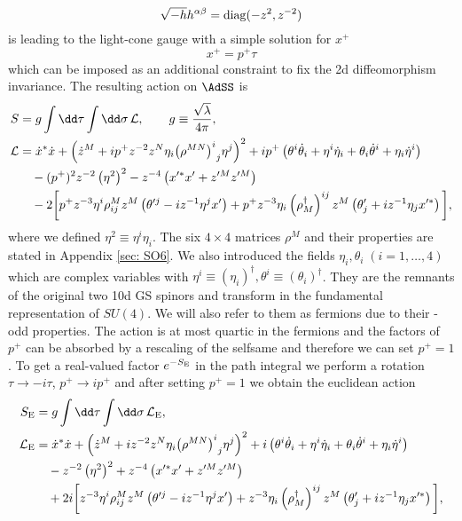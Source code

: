%
%
\begin{equation}
\sqrt{-h}h^{\alpha\beta} = {\rm diag}(-z^{2},z^{-2})
\end{equation}
%
%
is leading to the light-cone gauge with a simple solution for $x^{+}$ 
%
%
\begin{equation}
x^{+} = p^{+}\tau
\end{equation}
%
%
which can be imposed as an additional constraint to fix the 2d  diffeomorphism invariance. The resulting action on $\AdSS$ is 
%
%
\begin{align}
S &= g \int \dd \tau \int \dd \sigma \, \mathcal{L}, \qquad g\equiv \frac{\sqrt{\lambda}}{4\pi},  \\
%
\mathcal{L} &= \dot{x}^{*}\dot{x} + \left( \dot{z}^{M} + ip^{+}z^{-2}z^{N}\eta_{i} {\left(\rho^{MN}\right)^{i}}_{j} \eta^{j}\right)^{2} +ip^{+}\left( \theta^{i}\dot{\theta}_{i} + \eta^{i}\dot{\eta}_{i} +\theta_{i}\dot{\theta}^{i} + \eta_{i}\dot{\eta}^{i}\right) \notag \\
%
&\quad -(p^{+})^{2}z^{-2}\left(\eta^{2}\right)^{2} -z^{-4}\left(x'^{*}x' +z'^{M}z'^{M}\right) \notag \\
%
&\quad -2 \bigg[ p^{+}z^{-3}\eta^{i} \rho^{M}_{ij} z^{M} \left( \theta'^{j} -iz^{-1}\eta^{j}x'\right) +  p^{+}z^{-3}\eta_{i}\left(\rho^{\dagger}_{M}\right)^{ij}z^{M} \left(\theta'_{j}+iz^{-1}\eta_{j}x'^{*}\right) \bigg], \notag
\end{align}
%
%
where we defined $\eta^{2}\equiv \eta^{i}\eta_{i}$. The six $4 \times 4$ matrices $\rho^{M}$ and their properties are stated in Appendix \ref{sec: SO6}. We also introduced the fields $\eta_{i}, \theta_{i}\; {(i=1,\ldots,4)}$ which  are complex  variables with ${\eta^{i}\equiv (\eta_{i})^{\dagger}},{ \theta^{i}\equiv (\theta_{i})^{\dagger}}$. They are the remnants of the original two 10d  GS spinors and transform in the fundamental representation of $SU(4)$. We will also refer to them as fermions due to their -odd properties. The action is at most quartic in the fermions and the factors of $p^{+}$ can be absorbed by a rescaling of the selfsame and therefore we can set $p^{+}=1$. To get a real-valued  factor $e^{-S_{\rm E}}$ in the path integral we perform a  rotation ${\tau \to -i\tau}$, ${p^{+}\to ip^{+}}$ and after setting $p^{+}=1$ we obtain the euclidean action 
%
%
\begin{align}
S_{\rm E} &= g \int \dd\tau \int \dd\sigma \, \mathcal{L}_{\rm E},  \\
%
\mathcal{L}_{\rm E} &=\dot{x}^{*}\dot{x} + \left( \dot{z}^{M} + iz^{-2}z^{N}\eta_{i} {\left(\rho^{MN}\right)^{i}}_{j} \eta^{j}\right)^{2} +i\left( \theta^{i}\dot{\theta}_{i} + \eta^{i}\dot{\eta}_{i} +\theta_{i}\dot{\theta}^{i} + \eta_{i}\dot{\eta}^{i}\right) \notag \\
%
&\quad -z^{-2}\left(\eta^{2}\right)^{2} +z^{-4}\left(x'^{*}x' +z'^{M}z'^{M}\right) \notag \\
%
&\quad +2i \bigg[ z^{-3}\eta^{i} \rho^{M}_{ij} z^{M} \left( \theta'^{j} -iz^{-1}\eta^{j}x'\right) + z^{-3}\eta_{i}\left(\rho^{\dagger}_{M}\right)^{ij}z^{M} \left(\theta'_{j}+iz^{-1}\eta_{j}x'^{*}\right) \bigg], \notag
\end{align}
